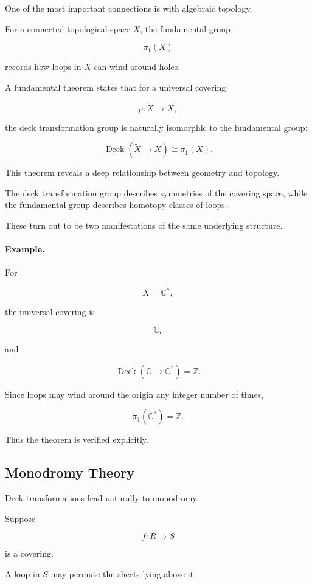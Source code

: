 \documentclass[12pt,a4paper]{article}
\theoremstyle{notespace}
\begin{document}
One of the most important connections is with algebraic topology.

For a connected topological space \(X\), the fundamental group

\[
\pi_1(X)
\]

records how loops in \(X\) can wind around holes.

A fundamental theorem states that for a universal covering

\[
p:\widetilde X\to X,
\]

the deck transformation group is naturally isomorphic to the fundamental group:

\[
\operatorname{Deck}(\widetilde X\to X)
\cong
\pi_1(X).
\]

This theorem reveals a deep relationship between geometry and topology.

The deck transformation group describes symmetries of the covering space, while the fundamental group describes homotopy classes of loops.

These turn out to be two manifestations of the same underlying structure.

\paragraph{Example.}

For

\[
X=\mathbb C^*,
\]

the universal covering is

\[
\mathbb C,
\]

and

\[
\operatorname{Deck}(\mathbb C\to\mathbb C^*)
=
\mathbb Z.
\]

Since loops may wind around the origin any integer number of times,

\[
\pi_1(\mathbb C^*)
=
\mathbb Z.
\]

Thus the theorem is verified explicitly.

\subsection{Monodromy Theory}

Deck transformations lead naturally to monodromy.

Suppose

\[
f:R\to S
\]

is a covering.

A loop in \(S\) may permute the sheets lying above it.
\end{document}
